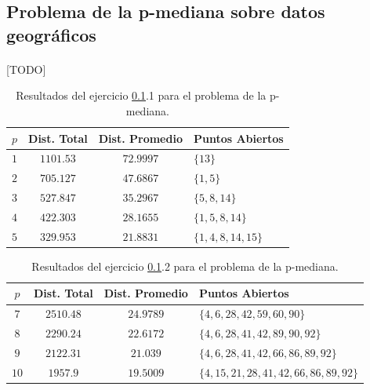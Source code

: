 \documentclass[spanish]{article}
\begin{document}
		\subsection{Problema de la p-mediana sobre datos geográficos}
		\label{sec:5.3}

			\paragraph{}
			[TODO]


			\begin{table}[h]
				\begin{center}
					\begin{tabular}{|c || c || c || l | }
						\hline
						$p$		& Dist. Total 	& Dist. Promedio	& Puntos Abiertos	 \\ \hline \hline
						$1$ 	& $1101.53$ 		& $72.9997$						& $\{13\}$ \\ \hline
						$2$ 	& $705.127$ 		& $47.6867$					& $\{1,5\}$ \\ \hline
						$3$ 	& $527.847$ 		& $35.2967$					& $\{5,8,14\}$ \\ \hline
						$4$ 	& $422.303$ 		& $28.1655$					& $\{1,5,8,14\}$ \\ \hline
						$5$ 	& $329.953$ 		& $21.8831$					& $\{1,4,8,14,15\}$ \\
						\hline
					\end{tabular}
				\end{center}
				\caption{Resultados del ejercicio \ref{sec:5.3}.1 para el problema de la p-mediana.}
				\label{table:sol-5.3.1}
			\end{table}

			\begin{table}[h]
				\begin{center}
					\begin{tabular}{|c || c || c || l | }
						\hline
						$p$		& Dist. Total 	& Dist. Promedio	& Puntos Abiertos	 \\ \hline \hline
						$7$ 	& $2510.48$ 		& $24.9789$				& $\{4,6,28,42,59,60,90\}$ \\ \hline
						$8$ 	& $2290.24$ 		& $22.6172$				& $\{4,6,28,41,42,89,90,92\}$ \\ \hline
						$9$ 	& $2122.31$ 		& $21.039$				& $\{4,6,28,41,42,66,86,89,92\}$ \\ \hline
						$10$ 	& $1957.9$ 			& $19.5009$				& $\{4,15,21,28,41,42,66,86,89,92\}$ \\
						\hline
					\end{tabular}
				\end{center}
				\caption{Resultados del ejercicio \ref{sec:5.3}.2 para el problema de la p-mediana.}
				\label{table:sol-5.3.2}
			\end{table}


	\nocite{subject:mio}
	
  
\end{document}
